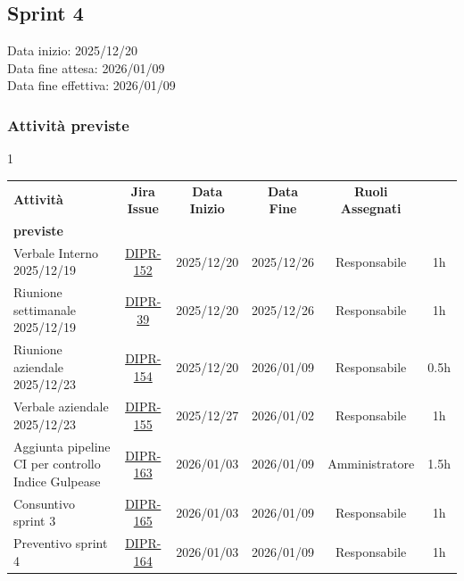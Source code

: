 \documentclass[a4paper,12pt]{article}
\begin{document}
\newpage

\subsection{Sprint 4}
Data inizio: 2025/12/20\\
Data fine attesa: 2026/01/09\\
Data fine effettiva: 2026/01/09

\subsubsection{Attività previste}

    \small
    \begin{spacing}{1}
    \begin{longtable}{|p{4cm}|c|c|c|c|c|}
        \hline
        \rowcolor{zpusgreen!30}
        \textbf{Attività} & \textbf{Jira Issue} & \textbf{Data Inizio} & \textbf{Data Fine} & \textbf{Ruoli Assegnati} & \begin{tabular}[c]{@{}c@{}} \textbf{Ore} \\ \textbf{previste} \end{tabular} \\
        \hline
        Verbale Interno 2025/12/19 & \href{https://7zpus.atlassian.net/browse/DIPR-152}{DIPR-152}& 2025/12/20 & 2025/12/26 & Responsabile & 1h \\
        \hline
        Riunione settimanale 2025/12/19 & \href{https://7zpus.atlassian.net/browse/DIPR-39}{DIPR-39} & 2025/12/20 & 2025/12/26 & Responsabile & 1h \\
        \hline
        Riunione aziendale 2025/12/23 & \href{https://7zpus.atlassian.net/browse/DIPR-154}{DIPR-154} & 2025/12/20 & 2026/01/09 & Responsabile & 0.5h \\
        \hline
        Verbale aziendale 2025/12/23 & \href{https://7zpus.atlassian.net/browse/DIPR-155}{DIPR-155}  & 2025/12/27 & 2026/01/02 & Responsabile & 1h \\ 
        \hline
        Aggiunta pipeline CI per controllo Indice Gulpease & \href{https://7zpus.atlassian.net/browse/DIPR-163}{DIPR-163} & 2026/01/03 & 2026/01/09 & Amministratore & 1.5h \\
        \hline
        Consuntivo sprint 3 & \href{https://7zpus.atlassian.net/browse/DIPR-165}{DIPR-165} & 2026/01/03 & 2026/01/09 & Responsabile & 1h \\
        \hline
        Preventivo sprint 4 & \href{https://7zpus.atlassian.net/browse/DIPR-164}{DIPR-164} & 2026/01/03 & 2026/01/09 & Responsabile & 1h\\
        \hline


\end{longtable}
\end{spacing}
\end{document}
